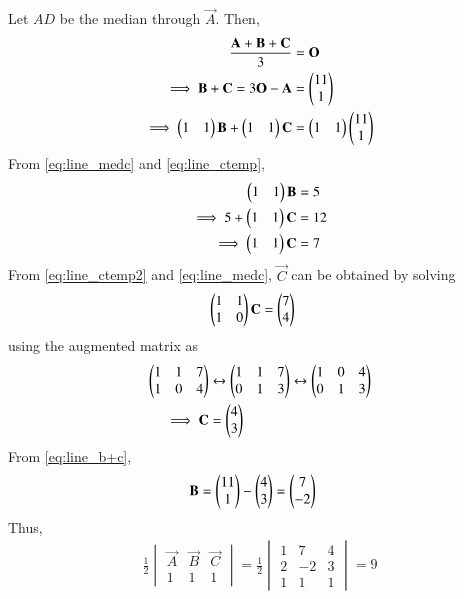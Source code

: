 \documentclass[journal,12pt,twocolumn]{IEEEtran}
\renewcommand\thesection{\arabic{section}}
\begin{document}
\begin{enumerate}[label=\thesection.\arabic*
,ref=\thesection.\theenumi]
\begin{equation}
\end{equation}
% 
Let  $AD$ be the median through $\vec{A}$. Then,
\begin{align}
\frac{\mathbf{A}+\mathbf{B}+\mathbf{C}}{3}&= \mathbf{O}
\\
\implies \mathbf{B}+\mathbf{C}= 3\mathbf{O}-\mathbf{A} &= \begin{pmatrix}11 \\ 1\end{pmatrix}
\label{eq:line_b+c}
\\
\implies \begin{pmatrix}1 & 1\end{pmatrix}\mathbf{B}+\begin{pmatrix}1 & 1\end{pmatrix}\mathbf{C}&=  \begin{pmatrix}1 & 1\end{pmatrix}\begin{pmatrix}11 \\ 1\end{pmatrix}
\label{eq:line_ctemp}
\end{align}
%
From \eqref{eq:line_medc} and \eqref{eq:line_ctemp},
\begin{align}
 \begin{pmatrix}1 & 1\end{pmatrix}\mathbf{B} &= 5 
\\
\implies 5+\begin{pmatrix}1 & 1\end{pmatrix}\mathbf{C}&=  12
\\
\implies \begin{pmatrix}1 & 1\end{pmatrix}\mathbf{C}&=  7
\label{eq:line_ctemp2}
\end{align}
From \eqref{eq:line_ctemp2} and \eqref{eq:line_medc}, $\vec{C}$ can be obtained by solving 
\begin{align}
\begin{pmatrix}1 & 1 \\1 & 0\end{pmatrix}\mathbf{C}&=\begin{pmatrix}7 \\ 4\end{pmatrix}
\label{eq:line_cmatrix}
\end{align}
using the augmented matrix as
\begin{align}
\begin{pmatrix}1 & 1 & 7\\1 & 0 & 4\end{pmatrix} &\leftrightarrow \begin{pmatrix}1 & 1 & 7\\0 & 1 & 3\end{pmatrix}\leftrightarrow \begin{pmatrix}1 & 0 & 4\\0 & 
1 & 3\end{pmatrix}
\\
\implies \mathbf{C}&=\begin{pmatrix}4\\3\end{pmatrix}
\end{align}
%
From \eqref{eq:line_b+c},
\begin{align}
\mathbf{B}&=\begin{pmatrix}11\\1\end{pmatrix}-\begin{pmatrix}4\\3\end{pmatrix}
=\begin{pmatrix}7\\-2\end{pmatrix}
\end{align}
%
Thus,
\begin{align}
\frac{1}{2}
\begin{vmatrix}
\vec{A} & \vec{B} &\vec{C}
\\
1 & 1 & 1
\end{vmatrix}
=
\frac{1}{2}
\begin{vmatrix}
1 & 7 & 4\\2 & -2 & 3 \\ 1 & 1 & 1
\end{vmatrix} = 9

\end{align}
\end{enumerate}
\end{document}
